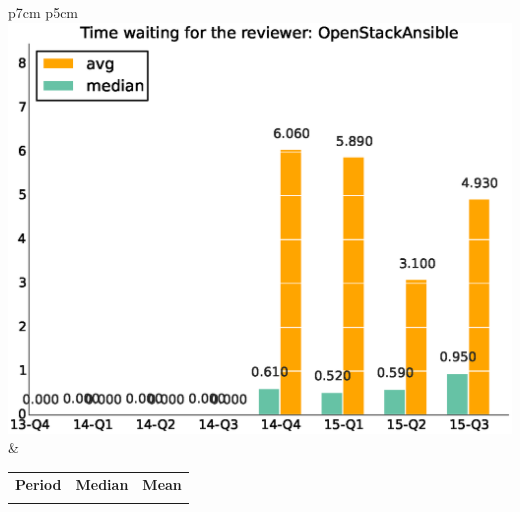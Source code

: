 \documentclass[a4wide,11pt]{article}
\begin{document}
\begin{tabular}{p{7cm} p{5cm}}
    \vspace{0pt} 
    \includegraphics[scale=.35]{figs/waiting4reviewer_avgOpenStackAnsible.eps}
    & 
    \vspace{0pt}
    \begin{tabular}{l|r|r|}%
    \bfseries Period & \bfseries Median & \bfseries Mean %
    \csvreader[head to column names]{data/timewaiting4reviewer_medianOpenStackAnsible.csv}{}%
    {\\ & \mediantime & \meantime}
    \end{tabular}
\end{tabular}
\end{document}

